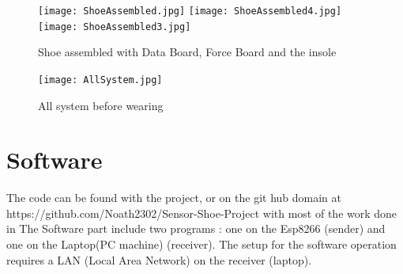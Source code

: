 \documentclass[12 pt, a4paper]{thesis}
\begin{document}
\begin{figure}[hbt!]
\centering
\texttt{[image: ShoeAssembled.jpg]}
\hfill
\texttt{[image: ShoeAssembled4.jpg]}
\hfill
\texttt{[image: ShoeAssembled3.jpg]}
\caption{Shoe assembled with Data Board, Force Board and the insole}
\end{figure}   
\begin{figure}[hbt!]
\centering
\texttt{[image: AllSystem.jpg]}
\caption{All system before wearing}
\end{figure}
\section{Software}
The code can be found with the project, or on the git hub domain at https://github.com/Noath2302/Sensor-Shoe-Project with most of the work done in 	
The Software part include two programs : one on the Esp8266 (sender) and one on the Laptop(PC machine) (receiver). The setup for the software operation requires a LAN (Local Area Network) on the receiver (laptop).
\end{document}
